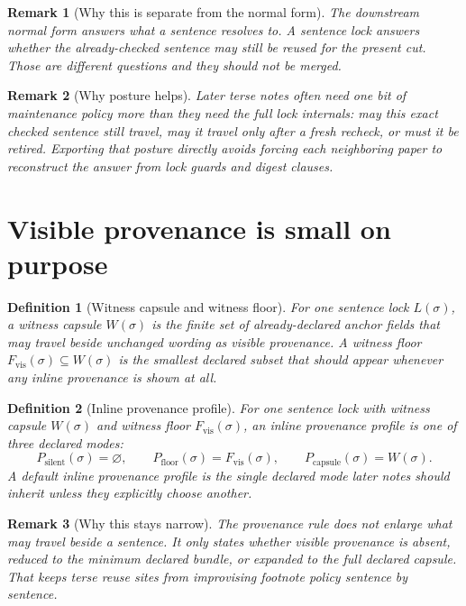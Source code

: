\documentclass[11pt]{article}
\newtheorem{definition}{Definition}
\newtheorem{remark}{Remark}
\begin{document}
\begin{remark}[Why this is separate from the normal form]
The downstream normal form answers what a sentence resolves to.
A sentence lock answers whether the already-checked sentence may still be reused for the present cut.
Those are different questions and they should not be merged.
\end{remark}

\begin{remark}[Why posture helps]
Later terse notes often need one bit of maintenance policy more than they need the full lock internals: may this exact checked sentence still travel, may it travel only after a fresh recheck, or must it be retired. Exporting that posture directly avoids forcing each neighboring paper to reconstruct the answer from lock guards and digest clauses.
\end{remark}

\section{Visible provenance is small on purpose}

\begin{definition}[Witness capsule and witness floor]
For one sentence lock $L(\sigma)$, a \emph{witness capsule} $W(\sigma)$ is the finite set of already-declared anchor fields that may travel beside unchanged wording as visible provenance.
A \emph{witness floor} $F_{\mathrm{vis}}(\sigma)\subseteq W(\sigma)$ is the smallest declared subset that should appear whenever any inline provenance is shown at all.
\end{definition}

\begin{definition}[Inline provenance profile]
For one sentence lock with witness capsule $W(\sigma)$ and witness floor $F_{\mathrm{vis}}(\sigma)$, an \emph{inline provenance profile} is one of three declared modes:
\[
P_{\mathrm{silent}}(\sigma)=\varnothing,
\qquad P_{\mathrm{floor}}(\sigma)=F_{\mathrm{vis}}(\sigma),
\qquad P_{\mathrm{capsule}}(\sigma)=W(\sigma).
\]
A \emph{default inline provenance profile} is the single declared mode later notes should inherit unless they explicitly choose another.
\end{definition}

\begin{remark}[Why this stays narrow]
The provenance rule does not enlarge what may travel beside a sentence.
It only states whether visible provenance is absent, reduced to the minimum declared bundle, or expanded to the full declared capsule.
That keeps terse reuse sites from improvising footnote policy sentence by sentence.
\end{remark}
\end{document}
